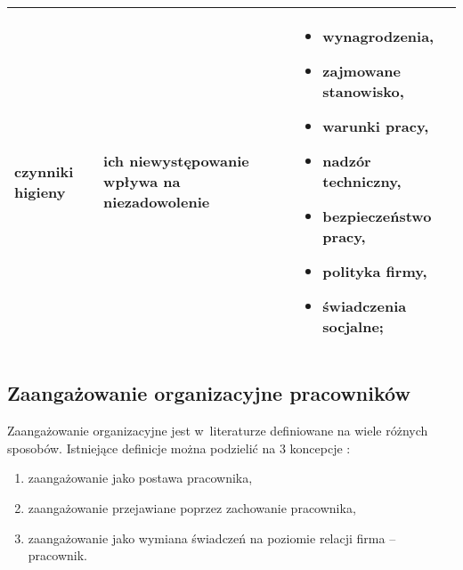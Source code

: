 \begin{minipage}{\textwidth}
\begin{table}[H]
\begin{center}
\begin{tabular}{|P{.2\textwidth}|P{.2\textwidth}|P{.5\textwidth}|}
                         czynniki higieny &
                         ich niewystępowanie wpływa na niezadowolenie &
                         \begin{itemize}
                             \item wynagrodzenia,
                             \item zajmowane stanowisko,
                             \item warunki pracy,
                             \item nadzór techniczny,
                             \item bezpieczeństwo pracy,
                             \item polityka firmy,
                             \item świadczenia socjalne;
                             \end{itemize}\\
                         \hline
                     \end{tabular}
                 \end{center}
                 \raggedright{}
                 \vspace{0.75cm}
             \end{table}
\end{minipage}

\subsection{Zaangażowanie organizacyjne pracowników}\label{sec:czynniki-wplywajace-na-fluktuacje:zaangazowanie-organizacyjne}
Zaangażowanie organizacyjne jest w~literaturze definiowane na wiele różnych sposobów.
Istniejące definicje można podzielić na 3 koncepcje \cite{juchnowicz-2010}:
\begin{enumerate}
    \item zaangażowanie jako postawa pracownika,
    \item zaangażowanie przejawiane poprzez zachowanie pracownika,
    \item zaangażowanie jako wymiana świadczeń na poziomie relacji firma -- pracownik.
\end{enumerate}

